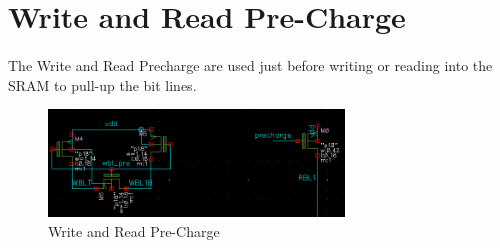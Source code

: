 \section{Write and Read Pre-Charge}
\paragraph{}

The Write and Read Precharge are used just before writing or reading into the SRAM to pull-up the bit lines.  


\begin{figure}[H]
\centering
\includegraphics[width=0.7\textwidth]{write_read_precharge.png}
\caption{Write and Read Pre-Charge}
\label{fig:Figure}
\end{figure}

